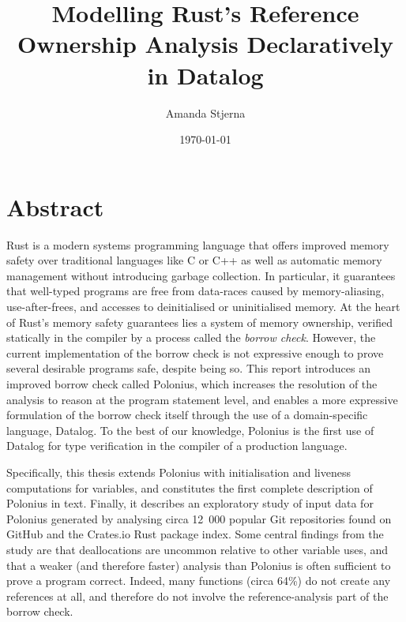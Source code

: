 \documentclass[11pt,a4paper,twoside,openany]{report}
\author{Amanda Stjerna}
\date{\today}
\title{Modelling Rust's Reference Ownership Analysis Declaratively in Datalog}
\renewcommand\_{\textunderscore\allowbreak}
\begin{document}


\maketitle

\section*{Abstract}

Rust is a modern systems programming language that offers improved memory safety
over traditional languages like C or C++ as well as automatic memory management
without introducing garbage collection. In particular, it guarantees that
well-typed programs are free from data-races caused by memory-aliasing,
use-after-frees, and accesses to deinitialised or uninitialised memory. At the
heart of Rust's memory safety guarantees lies a system of memory ownership,
verified statically in the compiler by a process called the \textit{borrow
  check}. However, the current implementation of the borrow check is not
expressive enough to prove several desirable programs safe, despite being so.
This report introduces an improved borrow check called Polonius, which increases
the resolution of the analysis to reason at the program statement level, and
enables a more expressive formulation of the borrow check itself through the use
of a domain-specific language, Datalog. To the best of our knowledge, Polonius
is the first use of Datalog for type verification in the compiler of a
production language.

Specifically, this thesis extends Polonius with initialisation and liveness
computations for variables, and constitutes the first complete description of
Polonius in text. Finally, it describes an exploratory study of input
data for Polonius generated by analysing circa 12~000 popular Git repositories
found on GitHub and the Crates.io Rust package index. Some central findings from
the study are that deallocations are uncommon relative to other variable uses,
and that a weaker (and therefore faster) analysis than Polonius is often
sufficient to prove a program correct. Indeed, many functions (circa 64\%) do
not create any references at all, and therefore do not involve the
reference-analysis part of the borrow check.
\end{document}
